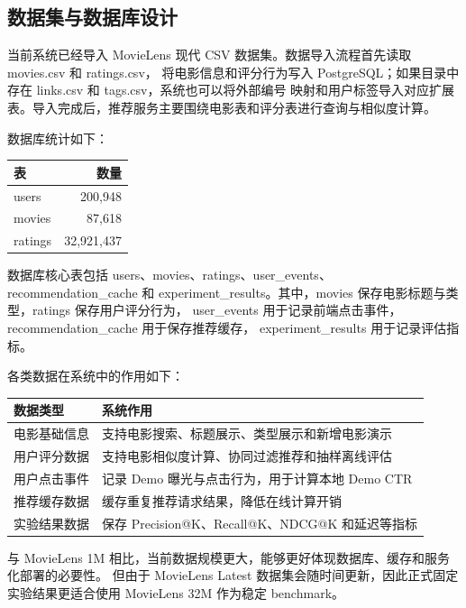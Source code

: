 \subsection{数据集与数据库设计}

当前系统已经导入 MovieLens 现代 CSV 数据集。数据导入流程首先读取 movies.csv 和 ratings.csv，
将电影信息和评分行为写入 PostgreSQL；如果目录中存在 links.csv 和 tags.csv，系统也可以将外部编号
映射和用户标签导入对应扩展表。导入完成后，推荐服务主要围绕电影表和评分表进行查询与相似度计算。

数据库统计如下：

\begin{center}
\begin{tabular}{lr}
\toprule
\textbf{表} & \textbf{数量} \\
\midrule
users   & 200{,}948 \\
movies  & 87{,}618 \\
ratings & 32{,}921{,}437 \\
\bottomrule
\end{tabular}
\end{center}

数据库核心表包括 users、movies、ratings、user\_events、recommendation\_cache 和
experiment\_results。其中，movies 保存电影标题与类型，ratings 保存用户评分行为，
user\_events 用于记录前端点击事件，recommendation\_cache 用于保存推荐缓存，
experiment\_results 用于记录评估指标。

各类数据在系统中的作用如下：

\begin{center}
\begin{tabular}{ll}
\toprule
\textbf{数据类型} & \textbf{系统作用} \\
\midrule
电影基础信息 & 支持电影搜索、标题展示、类型展示和新增电影演示 \\
用户评分数据 & 支持电影相似度计算、协同过滤推荐和抽样离线评估 \\
用户点击事件 & 记录 Demo 曝光与点击行为，用于计算本地 Demo CTR \\
推荐缓存数据 & 缓存重复推荐请求结果，降低在线计算开销 \\
实验结果数据 & 保存 Precision@K、Recall@K、NDCG@K 和延迟等指标 \\
\bottomrule
\end{tabular}
\end{center}

与 MovieLens 1M 相比，当前数据规模更大，能够更好体现数据库、缓存和服务化部署的必要性。
但由于 MovieLens Latest 数据集会随时间更新，因此正式固定实验结果更适合使用 MovieLens 32M
作为稳定 benchmark。

\newpage
